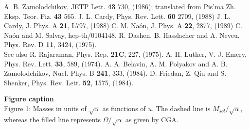 \documentclass[a4paper,12pt]{article}
\begin{document}
\begin{thebibliography}{<99>}
 A. B. Zamolodchikov, JETP Lett. {\bf 43} 730, (1986); translated from
Pis'ma Zh. Eksp. Teor. Fiz. {\bf 43} 565.
 J. L. Cardy, Phys. Rev. Lett. {\bf 60} 2709,
(1988)
J. L.  Cardy, J. Phys. A {\bf 21}, L797, (1988)
 C. M. Na\'on, J. Phys. A {\bf 22}, 2877, (1989)
 C. Na\'on and M. Salvay, hep-th/0104148.
 R. Dashen, B. Hasslacher and A. Neveu, Phys. Rev. D {\bf 11}, 3424,
(1975).\\ See also R. Rajaraman, Phys. Rep. {\bf 21C}, 227, (1975).
 A. H. Luther, V. J. Emery, Phys. Rev. Lett. {\bf 33}, 589,
(1974).
 A. A. Belavin, A. M. Polyakov and A. B. Zamolodchikov, Nucl. Phys. B
{\bf 241}, 333, (1984).
 D. Friedan, Z. Qiu and S. Shenker, Phys. Rev. Lett. {\bf 52}, 1575,
(1984).

\end{thebibliography}
\newpage


{\bf Figure caption}\\

Figure 1: Masses in units of $\sqrt{\alpha}$ as functions of $u$. The dashed line is
$M_{sol}/\sqrt{\alpha}$, whereas the filled line represents $\Omega/\sqrt{\alpha}$ as
given by CGA.\\
\end{document}

